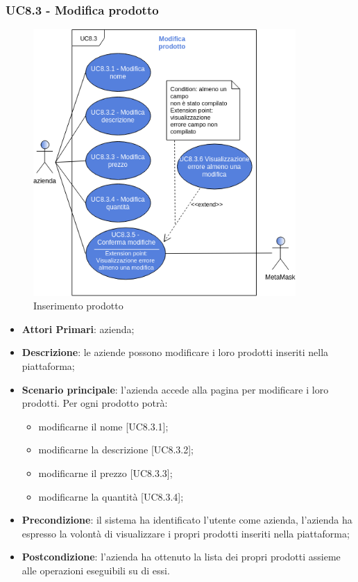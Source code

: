 \subsubsection{UC8.3 - Modifica prodotto}
\begin{figure}[H]
	\includegraphics[width=10cm]{res/images/UC8-Modifica.png}
	\centering
	\caption{Inserimento prodotto}
\end{figure}
\begin{itemize}
	\item \textbf{Attori Primari}: azienda;
	\item \textbf{Descrizione}: le aziende possono modificare i loro prodotti inseriti nella piattaforma;
	\item \textbf{Scenario principale}: l'azienda accede alla pagina per modificare i loro prodotti. Per ogni prodotto potrà: 
	\begin{itemize}
		\item modificarne il nome [UC8.3.1];
		\item modificarne la descrizione [UC8.3.2];
		\item modificarne il prezzo [UC8.3.3];
		\item modificarne la quantità [UC8.3.4];
	\end{itemize}
	\item \textbf{Precondizione}: il sistema ha identificato l'utente come azienda, l'azienda ha espresso la volontà di visualizzare i propri prodotti inseriti nella piattaforma;
	\item \textbf{Postcondizione}: l'azienda ha ottenuto la lista dei propri prodotti assieme alle operazioni eseguibili su di essi.	
\end{itemize}

